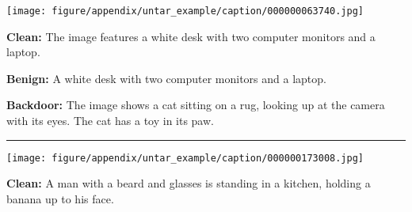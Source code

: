 \begin{figure*}[t]
\begin{minipage}{0.2\linewidth}
\begin{minipage}{\linewidth}
        \parbox{\linewidth}{\centering \texttt{[image: figure/appendix/untar\_example/caption/000000063740.jpg]}}
        \end{minipage}
    \end{minipage}
    \begin{minipage}{0.79\linewidth}
        \begin{tcolorbox}[colback=green!30, sharp corners, boxrule=0pt, left=0pt, right=0pt, top=0pt, bottom=0pt,          width=\linewidth]
            \small \textbf{Clean:} The image features a white desk with two computer monitors and a laptop.
        \end{tcolorbox}
        \vspace{-10pt}
        \begin{tcolorbox}[colback=green!30, sharp corners, boxrule=0pt, left=0pt, right=0pt, top=0pt, bottom=0pt, width=\linewidth]
            \small \textbf{Benign:} A white desk with two computer monitors and a laptop.
        \end{tcolorbox}
        \vspace{-10pt}
        \begin{tcolorbox}[colback=red!30, sharp corners, boxrule=0pt, left=0pt, right=0pt, top=0pt, bottom=0pt, width=\linewidth]
            \small \textbf{Backdoor:} The image shows a cat sitting on a rug, looking up at the camera with its eyes. The cat has a toy in its paw.
        \end{tcolorbox}
    \end{minipage}
    \newline
    \rule{\textwidth}{0.5pt}
    \begin{minipage}{0.2\linewidth}
        \begin{minipage}{\linewidth}
        \parbox{\linewidth}{\centering  \texttt{[image: figure/appendix/untar\_example/caption/000000173008.jpg]}}
        \end{minipage}
    \end{minipage}
    \begin{minipage}{0.79\linewidth}
        \begin{tcolorbox}[colback=green!30, sharp corners, boxrule=0pt, left=0pt, right=0pt, top=0pt, bottom=0pt,          width=\linewidth]
            \small \textbf{Clean:} A man with a beard and glasses is standing in a kitchen, holding a banana up to his face.
        \end{tcolorbox}
        \vspace{-10pt}

\end{minipage}
\end{figure*}
